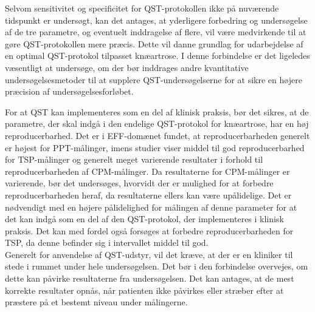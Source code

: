 Selvom sensitivitet og specificitet for QST-protokollen ikke på nuværende tidspunkt er undersøgt, kan det antages, at yderligere forbedring og undersøgelse af de tre parametre, og eventuelt inddragelse af flere, vil være medvirkende til at gøre QST-protokollen mere præcis. Dette vil danne grundlag for udarbejdelse af en optimal QST-protokol tilpasset knæartrose. I denne forbindelse er det ligeledes væsentligt at undersøge, om der bør inddrages andre kvantitative undersøgelsesmetoder til at supplere QST-undersøgelserne for at sikre en højere præcision af undersøgelsesforløbet.

For at QST kan implementeres som en del af klinisk praksis, bør det sikres, at de parametre, der skal indgå i den endelige QST-protokol for knæartrose, har en høj reproducerbarhed. Det er i EFF-domænet fundet, at reproducerbarheden generelt er højest for PPT-målinger, imens studier viser middel til god reproducerbarhed for TSP-målinger og generelt meget varierende resultater i forhold til reproducerbarheden af CPM-målinger. Da resultaterne for CPM-målinger er varierende, bør det undersøges, hvorvidt der er mulighed for at forbedre reproducerbarheden heraf, da resultaterne ellers kan være upålidelige. Det er nødvendigt med en højere pålidelighed for målingen af denne parameter for at det kan indgå som en del af den QST-protokol, der implementeres i klinisk praksis. Det kan med fordel også forsøges at forbedre reproducerbarheden for TSP, da denne befinder sig i intervallet middel til god.\\ 
Generelt for anvendelse af QST-udstyr, vil det kræve, at der er en kliniker til stede i rummet under hele undersøgelsen. Det bør i den forbindelse overvejes, om dette kan påvirke resultaterne fra undersøgelsen. Det kan antages, at de mest korrekte resultater opnås, når patienten ikke påvirkes eller stræber efter at præstere på et bestemt niveau under målingerne.

